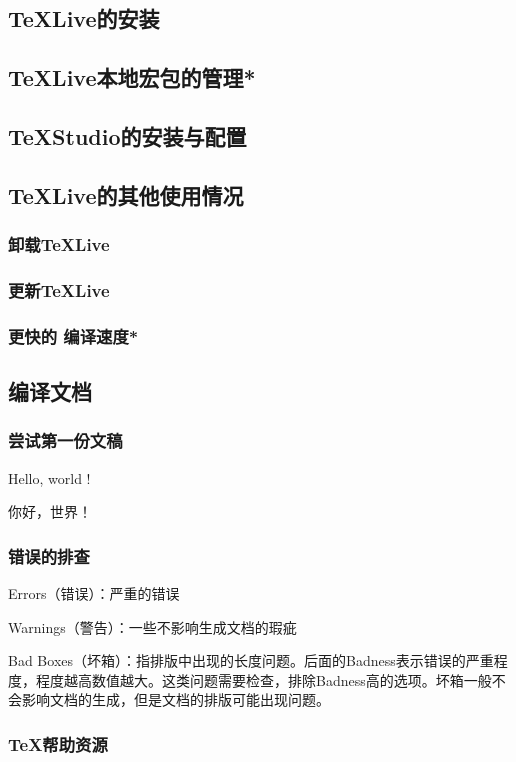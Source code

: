\documentclass[twoside]{ctexart} %
\begin{document}
    \subsection{\TeX Live的安装}
    \subsection{\TeX Live本地宏包的管理*}
    \subsection{\TeX Studio的安装与配置}
    \subsection{\TeX Live的其他使用情况}
        \subsubsection{卸载\TeX Live}
        \subsubsection{更新\TeX Live}
        \subsubsection{更快的 编译速度*}
    \subsection{编译文档}
	    \subsubsection{尝试第一份文稿}
		    Hello, world ! 

		    你好，世界！

	    \subsubsection{错误的排查}
            Errors（错误）：严重的错误

            Warnings（警告）：一些不影响生成文档的瑕疵

            Bad Boxes（坏箱）：指排版中出现的长度问题。后面的Badness表示错误的严重程度，程度越高数值越大。这类问题需要检查，排除Badness高的选项。坏箱一般不会影响文档的生成，但是文档的排版可能出现问题。

        \subsubsection{\TeX 帮助资源}
\end{document}
